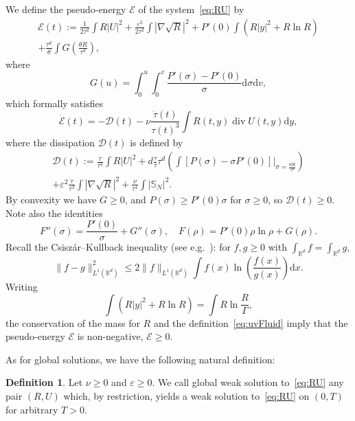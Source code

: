 \documentclass[11pt]{article}
\theoremstyle{definition}
\newtheorem{defi}[theo]{Definition}
\numberwithin{equation}{section}
\numberwithin{figure}{section}
\numberwithin{table}{section}
\DeclareMathOperator{\DIV}{div}
\newcommand*\R{\mathbb{R}}
\newcommand*\dd {\mathrm{d}}
\newcommand*\<{\left\langle}
\renewcommand*\>{\right\rangle}
\renewcommand*\le{\leqslant}
\renewcommand*\ge{\geqslant}
\newcommand*\eps{\varepsilon}
\begin{document}
We define the pseudo-energy $\mathcal E$ of the system~\eqref{eq:RU} by
\begin{multline}\label{eq:pseudo-energy}
\mathcal E(t) := \frac{1}{2\tau^2}\int R|U|^2+\frac{\eps^2}{2\tau^2} \int|\nabla \sqrt R|^2 +P'(0)\int (R |y|^2 + R \ln R) \\
+ \frac{\tau^d}{\theta}\int G\left(\frac{\theta R}{\tau^d}\right),
\end{multline}
where
\begin{equation*}
G(u) =\int_0^u\int_0^v \frac{P'(\sigma)-P'(0)}{\sigma} \dd \sigma \dd v,
\end{equation*}
which formally satisfies
\begin{equation}\label{eq:evol-pseudo}
\dot{\mathcal E}(t) =- \mathcal D(t) - \nu \frac{\dot
\tau(t)}{\tau(t)^3} \int R(t,y) \DIV U(t,y)\dd y,
\end{equation}
where the dissipation $\mathcal D(t) $ is defined by
\begin{multline}\label{eq:dissip-pseudo}
\mathcal D(t) := \frac{\dot \tau}{\tau^3}\int R |U|^2 + d\frac{\dot \tau}{\tau} \tau^d \left(\int \left[P\left(\sigma\right) -\sigma P'(0) \right] \big|_{\sigma= \frac{ \theta R}{\tau^d}} \right) \\
+\eps^2 \frac{\dot \tau}{\tau^3} \int |\nabla \sqrt R|^2 + \frac{\nu}{\tau^4} \int |\mathbb S_N|^2.
\end{multline}
By convexity we have $G\ge 0$, and $P(\sigma)\ge P'(0)\sigma$ for $\sigma\ge 0$, so $\mathcal D(t)\ge 0$. Note also the identities
\begin{equation}\label{eq:FG}
F''(\sigma) = \frac{P'(0)}{\sigma}+G''(\sigma),\quad F(\rho) = P'(0)\rho\ln \rho + G(\rho).
\end{equation}
Recall the Csisz\'ar--Kullback inequality (see e.g.~\cite[Theorem~8.2.7]{LogSob}): for $f,g\ge 0$ with $\int_{\R^d} f=\int_{\R^d} g$,
\begin{equation*}
\|f-g\|_{L^1({\mathbb R}^d)}^2\le 2 \|f\|_{L^1({\mathbb R}^d)}\int f(x)\ln \left(\frac{f(x)}{g(x)}\right) \dd x.
\end{equation*}
Writing
\[
\int (R |y|^2 + R \ln R) = \int R \ln \frac{R}{\Gamma},
\]
the conservation of the mass for $R$ and the definition~\eqref{eq:uvFluid} imply that the pseudo-energy $\mathcal E$ is non-negative, $\mathcal E\ge 0$.

As for global solutions, we have the following natural definition:

\begin{defi}\label{def:sol-globale}
Let $\nu \ge 0$ and $\varepsilon \ge 0.$ We call global weak solution to~\eqref{eq:RU} any pair $(R,U)$ which, by restriction, yields a weak solution to~\eqref{eq:RU} on $(0,T)$ for arbitrary $T>0.$
\end{defi}
\end{document}
